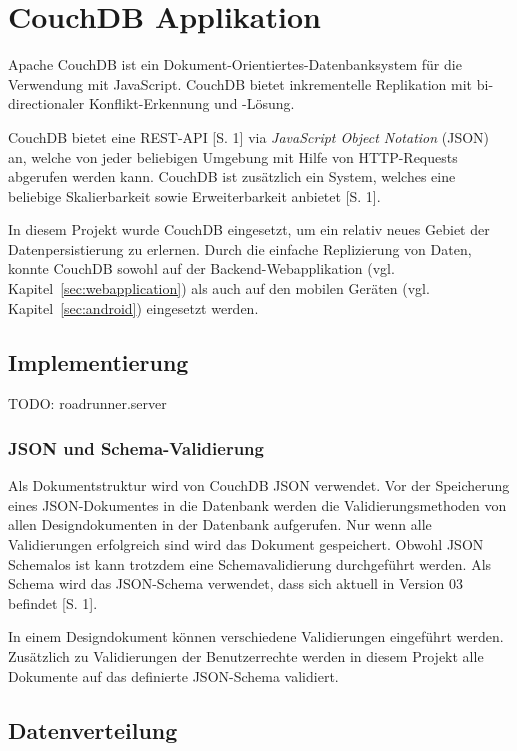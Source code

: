 \section{CouchDB Applikation}
\label{sec:couchdb}

Apache CouchDB ist ein Dokument-Orientiertes-Datenbanksystem für die Verwendung
	mit JavaScript. CouchDB bietet inkrementelle Replikation mit bi-directionaler
	Konflikt-Erkennung und -Lösung.
	
CouchDB bietet eine REST-API \cite{Fowler10}[S. 1] via \emph{JavaScript Object
	Notation} (JSON) an, welche von jeder beliebigen Umgebung mit Hilfe von
	HTTP-Requests abgerufen werden kann. CouchDB ist zusätzlich ein System, welches
	eine beliebige Skalierbarkeit sowie Erweiterbarkeit anbietet
	\cite{CouchDB11}[S. 1].
	
In diesem Projekt wurde CouchDB eingesetzt, um ein relativ neues Gebiet der
	Datenpersistierung zu erlernen. Durch die einfache Replizierung von Daten,
	konnte CouchDB sowohl auf der Backend-Webapplikation (vgl.
	Kapitel~\ref{sec:webapplication}) als auch auf den mobilen Geräten (vgl.
	Kapitel~\ref{sec:android}) eingesetzt werden.

\subsection{Implementierung}

TODO: roadrunner.server

\subsubsection{JSON und Schema-Validierung}
Als Dokumentstruktur wird von CouchDB JSON verwendet. Vor der Speicherung eines
	JSON-Dokumentes in die Datenbank werden die Validierungsmethoden von allen
	Designdokumenten in der Datenbank aufgerufen. Nur wenn alle Validierungen
	erfolgreich sind wird das Dokument gespeichert. Obwohl JSON Schemalos ist
	kann trotzdem eine Schemavalidierung durchgeführt werden. Als Schema wird
	das JSON-Schema verwendet, dass sich aktuell in Version 03
	befindet \cite{IETF11}[S. 1]. 

In einem Designdokument können verschiedene Validierungen eingeführt werden.
	Zusätzlich zu Validierungen der Benutzerrechte werden in diesem Projekt alle
	Dokumente auf das definierte JSON-Schema validiert.

\subsection{Datenverteilung}

